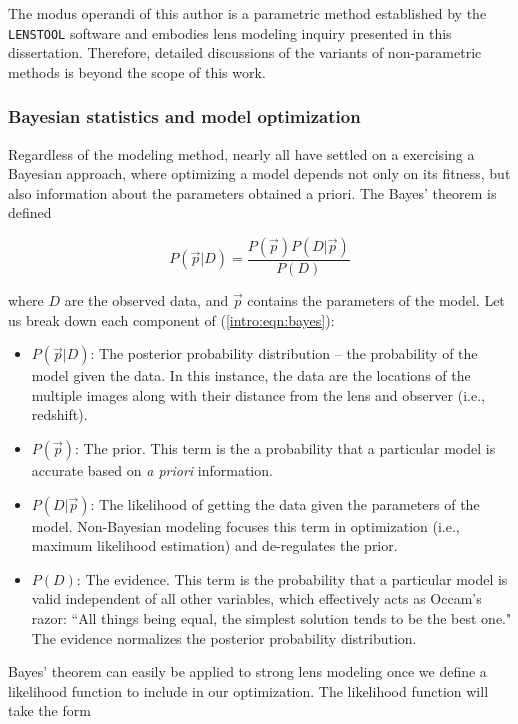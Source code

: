 The modus operandi of this author is a parametric method established by the \texttt{LENSTOOL} software \citet{Jullo:2007lr} and embodies lens modeling inquiry presented in this dissertation. Therefore, detailed discussions of the variants of non-parametric methods is beyond the scope of this work.

\subsubsection{Bayesian statistics and model optimization}

Regardless of the modeling method, nearly all have settled on a exercising a Bayesian approach, where optimizing a model depends not only on its fitness, but also information about the parameters obtained a priori. The Bayes' theorem is defined

\begin{equation}
P(\vec{p} | D ) = \frac{P(\vec{p}) P(D | \vec{p} ) }{P(D)}
\label{intro:eqn:bayes}
\end{equation}

\noindent where $D$ are the observed data, and $\vec{p}$ contains the parameters of the model. Let us break down each component of (\ref{intro:eqn:bayes}):

\begin{itemize}
\item $P(\vec{p} | D )$: The posterior probability distribution -- the probability of the model given the data. In this instance, the data are the locations of the multiple images along with their distance from the lens and observer (i.e., redshift).
\item $P(\vec{p})$: The prior. This term is the a probability that a particular model is accurate based on {\it a priori} information.
\item $P(D | \vec{p} )$:  The likelihood of getting the data given the parameters of the model. Non-Bayesian modeling focuses this term in optimization (i.e., maximum likelihood estimation) and de-regulates the prior.
\item $P(D)$: The evidence. This term is the probability that a particular model is valid independent of all other variables, which effectively acts as Occam's razor: ``All things being equal, the simplest solution tends to be the best one." The evidence normalizes the posterior probability distribution.
\end{itemize}

Bayes' theorem can easily be applied to strong lens modeling once we define a likelihood function to include in our optimization. The likelihood function will take the form

